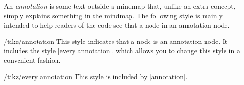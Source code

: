 An \emph{annotation} is some text outside a mindmap that, unlike an extra
concept, simply explains something in the mindmap. The following style is
mainly intended to help readers of the code see that a node in an annotation
node.

\begin{stylekey}{/tikz/annotation}
    This style indicates that a node is an annotation node. It includes the
    style |every annotation|, which allows you to change this style in a
    convenient fashion.
\begin{codeexample}[preamble={\usetikzlibrary{mindmap}}]
\end{codeexample}
    \begin{stylekey}{/tikz/every annotation}
        This style is included by |annotation|.
    \end{stylekey}
\end{stylekey}


